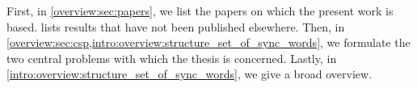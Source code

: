 

First, in \cref{overview:sec:papers}, we list the papers on which the present work is based.
 lists results that have not been published elsewhere.
Then, in \cref{overview:sec:csp,intro:overview:structure_set_of_sync_words},
we formulate the two central problems with which the thesis is concerned. 
Lastly, in \cref{intro:overview:structure_set_of_sync_words}, we give a broad overview.
